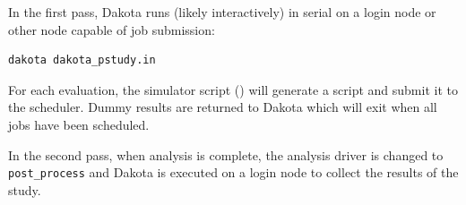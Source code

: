 In the first pass, Dakota runs (likely interactively) in serial on a
login node or other node capable of job submission:
\begin{verbatim}
dakota dakota_pstudy.in
\end{verbatim}
For each evaluation, the simulator script
() will generate a 
script and submit it to the scheduler.  Dummy results are returned to
Dakota which will exit when all jobs have been scheduled.

In the second pass, when analysis is complete, the analysis driver is
changed to {\tt post\_process} and Dakota is executed on a login node
to collect the results of the study.
